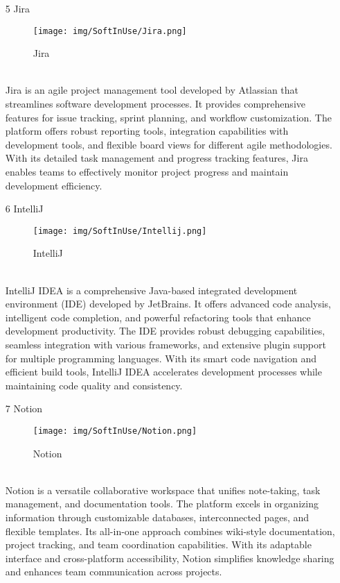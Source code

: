 \documentclass[conference]{IEEEtran}
\begin{document}
\begin{enumerate}
\begin{itemize}
\begin{itemize}
\begin{enumerate}
\item[5] Jira
\begin{figure}[h]
\centering
\texttt{[image: img/SoftInUse/Jira.png]}
\caption{Jira} 
\end{figure}\\
Jira is an agile project management tool developed by Atlassian that streamlines software development processes. It provides comprehensive features for issue tracking, sprint planning, and workflow customization. The platform offers robust reporting tools, integration capabilities with development tools, and flexible board views for different agile methodologies. With its detailed task management and progress tracking features, Jira enables teams to effectively monitor project progress and maintain development efficiency.\\


\item[6] IntelliJ
\begin{figure}[h]
\centering
\texttt{[image: img/SoftInUse/Intellij.png]}
\caption{IntelliJ} 
\end{figure}\\
IntelliJ IDEA is a comprehensive Java-based integrated development environment (IDE) developed by JetBrains. It offers advanced code analysis, intelligent code completion, and powerful refactoring tools that enhance development productivity. The IDE provides robust debugging capabilities, seamless integration with various frameworks, and extensive plugin support for multiple programming languages. With its smart code navigation and efficient build tools, IntelliJ IDEA accelerates development processes while maintaining code quality and consistency.\\

\item[7] Notion
\begin{figure}[h]
\centering
\texttt{[image: img/SoftInUse/Notion.png]}
\caption{Notion} 
\end{figure}\\
Notion is a versatile collaborative workspace that unifies note-taking, task management, and documentation tools. The platform excels in organizing information through customizable databases, interconnected pages, and flexible templates. Its all-in-one approach combines wiki-style documentation, project tracking, and team coordination capabilities. With its adaptable interface and cross-platform accessibility, Notion simplifies knowledge sharing and enhances team communication across projects.\\


\end{enumerate}
\end{itemize}
\end{itemize}
\end{enumerate}
\end{document}

